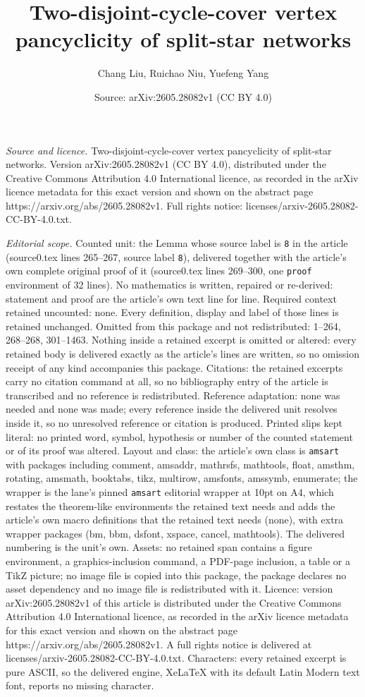 \documentclass[10pt,a4paper]{amsart}
\title[Two-disjoint-cycle-cover vertex pancyclicity of split-star n]{Two-disjoint-cycle-cover vertex pancyclicity of split-star networks}
\author{Chang Liu, Ruichao Niu, Yuefeng Yang}
\date{Source: arXiv:2605.28082v1 (CC BY 4.0)}
\begin{document}
\maketitle

\noindent\emph{Source and licence.} Two-disjoint-cycle-cover vertex pancyclicity of split-star networks. Version arXiv:2605.28082v1 (CC BY 4.0), distributed under the Creative Commons Attribution 4.0 International licence, as recorded in the arXiv licence metadata for this exact version and shown on the abstract page https://arxiv.org/abs/2605.28082v1. Full rights notice: licenses/arxiv-2605.28082-CC-BY-4.0.txt.\par\smallskip

\noindent\textit{Editorial scope.} Counted unit: the Lemma whose source label is \texttt{8} in the article (source0.tex lines 265--267, source label \texttt{8}), delivered together with the article's own complete original proof of it (source0.tex lines 269--300, one \texttt{proof} environment of 32 lines). No mathematics is written, repaired or re-derived: statement and proof are the article's own text line for line. Required context retained uncounted: none. Every definition, display and label of those lines is retained unchanged. Omitted from this package and not redistributed: 1--264, 268--268, 301--1463. Nothing inside a retained excerpt is omitted or altered: every retained body is delivered exactly as the article's lines are written, so no omission receipt of any kind accompanies this package. Citations: the retained excerpts carry no citation command at all, so no bibliography entry of the article is transcribed and no reference is redistributed. Reference adaptation: none was needed and none was made; every reference inside the delivered unit resolves inside it, so no unresolved reference or citation is produced. Printed slips kept literal: no printed word, symbol, hypothesis or number of the counted statement or of its proof was altered. Layout and class: the article's own class is \texttt{amsart} with packages including comment, amsaddr, mathrsfs, mathtools, float, amsthm, rotating, amsmath, booktabs, tikz, multirow, amsfonts, amssymb, enumerate; the wrapper is the lane's pinned \texttt{amsart} editorial wrapper at 10pt on A4, which restates the theorem-like environments the retained text needs and adds the article's own macro definitions that the retained text needs (none), with extra wrapper packages (bm, bbm, dsfont, xspace, cancel, mathtools). The delivered numbering is the unit's own. Assets: no retained span contains a figure environment, a graphics-inclusion command, a PDF-page inclusion, a table or a TikZ picture; no image file is copied into this package, the package declares no asset dependency and no image file is redistributed with it. Licence: version arXiv:2605.28082v1 of this article is distributed under the Creative Commons Attribution 4.0 International licence, as recorded in the arXiv licence metadata for this exact version and shown on the abstract page https://arxiv.org/abs/2605.28082v1. A full rights notice is delivered at licenses/arxiv-2605.28082-CC-BY-4.0.txt. Characters: every retained excerpt is pure ASCII, so the delivered engine, XeLaTeX with its default Latin Modern text font, reports no missing character.
\end{document}

